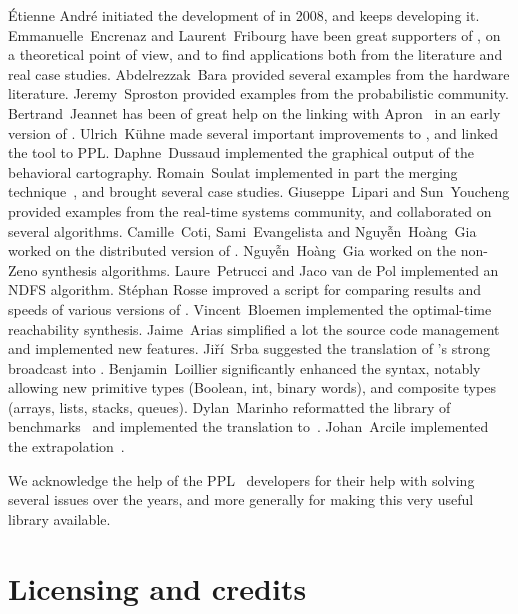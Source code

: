 \sloppy
\'Etienne André initiated the development of \imitator{} in 2008, and keeps developing it.
Emmanuelle~Encrenaz and Laurent~Fribourg have been great supporters of \imitator{}, on a theoretical point of view, and to find applications both from the literature and real case studies.
Abdelrezzak~Bara provided several examples from the hardware literature.
Jeremy~Sproston provided examples from the probabilistic community.
Bertrand~Jeannet has been of great help on the linking with Apron~\cite{JM09} in an early version of \imitator{}.
Ulrich~K\"uhne made several important improvements to \imitator{}, and linked the tool to PPL.
Daphne~Dussaud implemented the graphical output of the behavioral cartography.
Romain~Soulat implemented in part the merging technique~\cite{AFS13atva}, and brought several case studies.
Giuseppe~Lipari and Sun~Youcheng provided examples from the real-time systems community, and collaborated on several algorithms.
Camille~Coti, Sami~Evangelista and Nguy\~{ê}n~Hoàng~Gia worked on the distributed version of \imitator{}.
Nguy\~{ê}n~Hoàng~Gia worked on the non-Zeno synthesis algorithms.
Laure~Petrucci and Jaco van de Pol implemented an NDFS algorithm.
%
Stéphan Rosse improved a script for comparing results and speeds of various versions of \imitator{}.
%
Vincent~Bloemen implemented the optimal-time reachability synthesis.
%
Jaime~Arias simplified a lot the source code management and implemented new features.
%
Jiří~Srba suggested the translation of \imitator{}'s strong broadcast into \uppaal{}.
%
Benjamin~Loillier significantly enhanced the syntax, notably allowing new primitive types (Boolean, int, binary words), and composite types (arrays, lists, stacks, queues).
%
Dylan~Marinho reformatted the library of benchmarks~\cite{AMP21} and implemented the translation to~\jani{}.
%
Johan~Arcile implemented the extrapolation~\cite{AA22}.

We acknowledge the help of the PPL~\cite{BHZ08} developers for their help with solving several issues over the years, and more generally for making this very useful library available.




\chapter{Licensing and credits}

